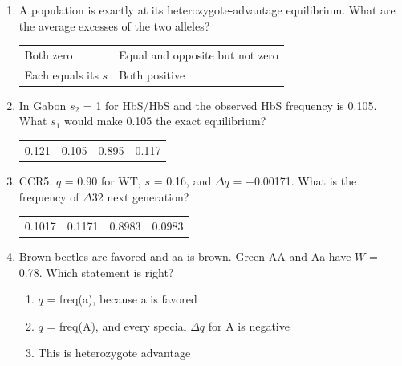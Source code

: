 \documentclass[11pt]{article}
\newcommand{\work}[1]{\par\vspace{#1}}
\begin{document}
\begin{enumerate}[label=\textbf{\arabic*.}, leftmargin=2em, itemsep=1.4em]
\work{1.6cm}
\item A population is exactly at its heterozygote-advantage equilibrium. What are the average excesses of the two alleles?
\par\smallskip\noindent\begin{tabularx}{\linewidth}{@{}YY@{}}
Both zero & Equal and opposite but not zero \\[3pt]
Each equals its \(s\) & Both positive \\
\end{tabularx}
\item In Gabon \(s_2\) = 1 for HbS/HbS and the observed HbS frequency is 0.105. What \(s_1\) would make 0.105 the exact equilibrium?
\par\smallskip\noindent\begin{tabularx}{\linewidth}{@{}YYYY@{}}
0.121 & 0.105 & 0.895 & 0.117 \\
\end{tabularx}
\work{1.6cm}
\item CCR5. \(q\) = 0.90 for WT, \(s\) = 0.16, and \(\Delta q\) = \(-\)0.00171. What is the frequency of \(\Delta\)32 next generation?
\par\smallskip\noindent\begin{tabularx}{\linewidth}{@{}YYYY@{}}
0.1017 & 0.1171 & 0.8983 & 0.0983 \\
\end{tabularx}
\work{1.6cm}
\item Brown beetles are favored and aa is brown. Green AA and Aa have \(W\) = 0.78. Which statement is right?
\par\smallskip
\begin{enumerate}[label={}, leftmargin=2.4em, labelwidth=0pt, itemsep=2pt, topsep=0pt]
\item \hspace*{-2.4em}\(q\) = freq(a), because a is favored
\item \hspace*{-2.4em}\(q\) = freq(A), and every special \(\Delta q\) for A is negative
\item \hspace*{-2.4em}This is heterozygote advantage

\end{enumerate}
\end{enumerate}
\end{document}
